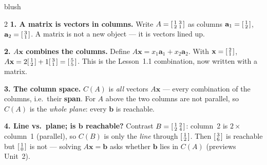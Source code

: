 \documentclass[10pt]{article}
\newcommand{\xx}{\mathbf{x}}
\newcommand{\bb}{\mathbf{b}}
\begin{document}
\begin{skillbox}[Lesson]{blush}
\begin{multicols}{2}
\textbf{1. A matrix is vectors in columns.} Write $A=\begin{bsmallmatrix} 1 & 3 \\ 2 & 1 \end{bsmallmatrix}$
as columns $\mathbf{a}_1=\begin{bsmallmatrix} 1\\2 \end{bsmallmatrix}$,
$\mathbf{a}_2=\begin{bsmallmatrix} 3\\1 \end{bsmallmatrix}$. A matrix is not a new object --- it is
vectors lined up.

\textbf{2. $A\xx$ combines the columns.} Define
$A\xx = x_1\mathbf{a}_1 + x_2\mathbf{a}_2$. With $\xx=\begin{bsmallmatrix} 2\\1 \end{bsmallmatrix}$,
$A\xx=2\begin{bsmallmatrix} 1\\2 \end{bsmallmatrix}+1\begin{bsmallmatrix} 3\\1 \end{bsmallmatrix}
=\begin{bsmallmatrix} 5\\5 \end{bsmallmatrix}$. This is the Lesson~1.1 combination, now written with a matrix.

\columnbreak

\textbf{3. The column space.} $C(A)$ is \emph{all} vectors $A\xx$ --- every combination of the
columns, i.e.\ their \textbf{span}. For $A$ above the two columns are not parallel, so $C(A)$ is
the \emph{whole plane}: every $\bb$ is reachable.

\textbf{4. Line vs.\ plane; is $\bb$ reachable?} Contrast $B=\begin{bsmallmatrix} 1 & 2 \\ 2 & 4 \end{bsmallmatrix}$:
column~2 is $2\times$ column~1 (parallel), so $C(B)$ is only the \emph{line} through
$\begin{bsmallmatrix} 1\\2 \end{bsmallmatrix}$. Then $\begin{bsmallmatrix} 3\\6 \end{bsmallmatrix}$ is
reachable but $\begin{bsmallmatrix} 1\\0 \end{bsmallmatrix}$ is not --- solving $A\xx=\bb$ asks
whether $\bb$ lies in $C(A)$ (previews Unit~2).
\end{multicols}
\end{skillbox}
\end{document}
